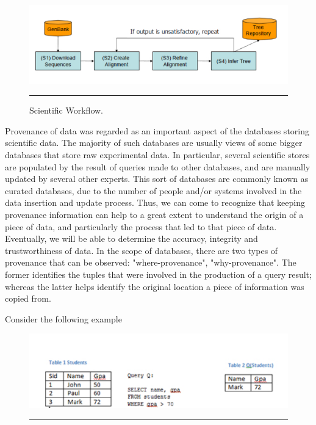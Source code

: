 \begin{figure}[htbp]
	\centering
		\includegraphics[scale=0.50]{./Figures/chapter2/figure1.pdf}
		\rule{35em}{0.5pt}
	\caption[Scientific Workflow]{Scientific Workflow.\cite{reference6}}
	\label{fig:scientificWorkflow}
\end{figure}


Provenance of data was regarded as an important aspect of the databases storing scientific data. The majority of such databases are usually views of some bigger databases that store raw experimental data. In particular, several scientific stores are populated by the result of queries made to other databases, and are manually updated by several other experts. This sort of databases are commonly known as curated databases\cite{reference1:53}, due to the number of people and/or systems involved in the data insertion and update process. Thus, we can come to recognize that keeping provenance information can help to a great extent to understand the origin of a piece of data, and particularly the process that led to that piece of data. Eventually, we will be able to determine the accuracy, integrity and trustworthiness of data\cite{reference3}.
In the scope of databases, there are two types of provenance that can be observed: "where-provenance", "why-provenance"\cite{reference3:7}. The former identifies the tuples that were involved in the production of a query result; whereas the latter helps identify the original location a piece of information was copied from.

Consider the following example

\begin{figure}[htbp]
	\centering
		\includegraphics{./Figures/table.pdf}
		\rule{35em}{0.5pt}
	\label{fig:scientificWorkflow}
\end{figure}


